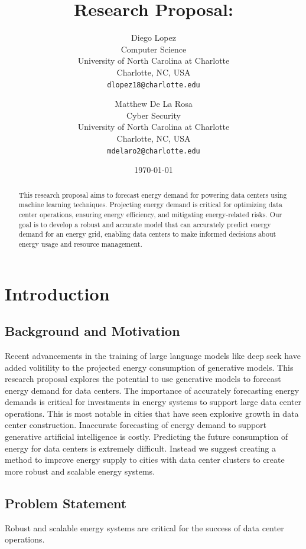 \documentclass[12pt]{article}
\title{Research Proposal:\\
[Data Center Energy Demand Forecasting Using LSTM]}
\author{Diego Lopez\\
Computer Science\\
University of North Carolina at Charlotte\\
Charlotte, NC, USA\\
\texttt{dlopez18@charlotte.edu}\\
\and
Matthew De La Rosa\\
Cyber Security\\
University of North Carolina at Charlotte\\
Charlotte, NC, USA\\
\texttt{mdelaro2@charlotte.edu}}
\date{\today}
\begin{document}
\maketitle

\begin{abstract}
This research proposal aims to forecast energy demand for powering data centers using machine learning techniques.
Projecting energy demand is critical for optimizing data center operations, ensuring energy efficiency, and mitigating energy-related risks.
Our goal is to develop a robust and accurate model that can accurately predict energy demand for an energy grid, enabling data centers to make informed decisions about energy usage and resource management.
\end{abstract}

\section{Introduction}
\subsection{Background and Motivation}
Recent advancements in the training of large language models like deep seek have added volitility to the projected energy consumption of generative models.
This research proposal explores the potential to use generative models to forecast energy demand for data centers. The importance of accurately forecasting energy demands
is critical for investments in energy systems to support large data center operations. This is most notable in cities that have seen explosive growth in data center construction.
Inaccurate forecasting of energy demand to support generative artificial intelligence is costly. Predicting the future consumption of energy for data centers is extremely difficult.
Instead we suggest creating a method to improve energy supply to cities with data center clusters to create more robust and scalable energy systems.

\subsection{Problem Statement}
Robust and scalable energy systems are critical for the success of data center operations.
\end{document}
